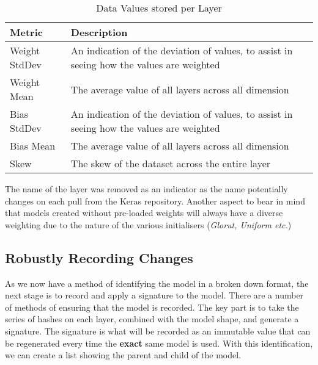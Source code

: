 \begin{table}[!ht]
    \centering
    \caption{Data Values stored per Layer}
    \setlength\tabcolsep{0pt} %
    \begin{tabular}{@{} p{2cm} p{6.5cm}  @{}}
        \hline
        Metric & Description \\
        \hline
        Weight StdDev  & An indication of the deviation of values, to assist in seeing how the values are weighted \\
        Weight Mean    & The average value of all layers across all dimension \\
        Bias StdDev  & An indication of the deviation of values, to assist in seeing how the values are weighted \\
        Bias Mean    & The average value of all layers across all dimension \\
        Skew   & The skew of the dataset across the entire layer \\
        \hline
    \end{tabular}
\end{table}

The name of the layer was removed as an indicator as the name potentially changes on each pull from the Keras repository. Another aspect to bear in mind that models created without pre-loaded weights will always have a diverse weighting due to the nature of the various initialisers (\textit{Glorut, Uniform etc.})

\subsection{Robustly Recording Changes}
As we now have a method of identifying the model in a broken down format, the next stage is to record and apply a signature to the model. There are a number of methods of ensuring that the model is recorded. The key part is to take the series of hashes on each layer, combined with the model shape, and generate a signature. The signature is what will be recorded as an immutable value that can be regenerated every time the \textbf{exact} same model is used. With this identification, we can create a list showing the parent and child of the model.

